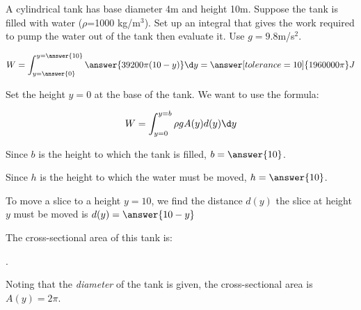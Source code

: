 \documentclass{ximera}
\author{Jim Talamo and Alex Beckwith}
\begin{document}
\begin{exercise}

A cylindrical tank has base diameter 4m and height 10m. Suppose the tank is filled with water ($\rho$=1000 kg/m$^3$). Set up an integral that gives the work required to pump the water out of the tank then evaluate it.  Use $g=9.8$m/s$^2$.

\begin{image}
\end{image}

\[
W= \int_{y=\answer{0}}^{y=\answer{10}} \answer{39200\pi (10-y)}\d y = \answer[tolerance=10]{1960000\pi} J
\]
\begin{hint}
Set the height $y=0$ at the base of the tank.  We want to use the formula:

\[ 
W = \int_{y=0}^{y=b} \rho g A(y) d(y) \d y
\]

Since $b$ is the height to which the tank is filled, $b=\answer{10}$.

Since $h$ is the height to which the water must be moved, $h=\answer{10}$.

To move a slice to a height $y=10$, we find the distance $d(y)$ the slice at height $y$ must be moved is $d(y) = \answer{10-y}$

The cross-sectional area of this tank is:

\begin{multipleChoice}
.
\end{multipleChoice}

\begin{question}
Noting that the \emph{diameter} of the tank is given, the cross-sectional area is $A(y) = 2 \pi$.
\end{question}
\end{hint}
\end{exercise}
\end{document}
